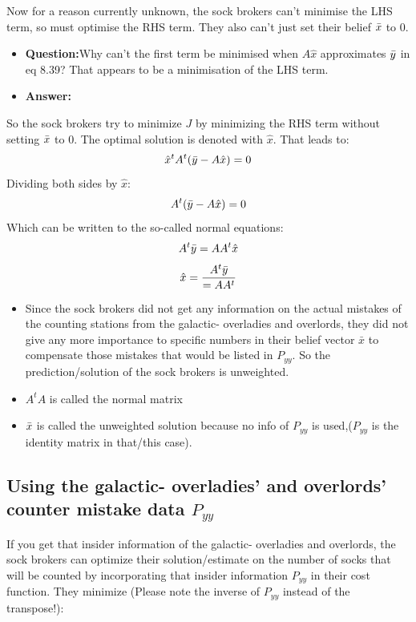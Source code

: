 Now for a reason currently unknown, the sock brokers can't minimise the LHS term, so must optimise the RHS term. They also can't just set their belief $\Bar{x}$ to 0.
\begin{itemize}
    \item \textbf{Question:}Why can't the first term be minimised when $A\hat{x}$ approximates $\Bar{y}$ in eq 8.39? That appears to be a minimisation of the LHS term.
    \item \textbf{Answer:}
\end{itemize}
So the sock brokers try to minimize $J$ by minimizing the RHS term without setting $\Bar{x}$ to 0. The optimal solution is denoted with $\hat{x}$. That leads to:
\begin{equation}
    \hat{x}^tA^t(\Bar{y}-A\hat{x})=0
\end{equation}
Dividing both sides by $\hat{x}$:
\begin{equation}
    A^t(\Bar{y}-A\hat{x})=0
\end{equation}
Which can be written to the so-called normal equations:
\begin{equation}
    A^t\Bar{y}=AA^t\hat{x}
\end{equation}
\begin{equation}
    \hat{x}=\frac{A^t\Bar{y}}{=AA^t}
    \label{eq:broker_solution}
\end{equation}
\begin{itemize}
    \item 
    Since the sock brokers did not get any information on the actual mistakes of the counting stations from the galactic- overladies and overlords, they did not give any more importance to specific numbers in their belief vector $\bar{x}$ to compensate those mistakes that would be listed in $P_{yy}$. So the prediction/solution of the sock brokers is unweighted.
    \item $A^tA$ is called the normal matrix 
    \item $\Bar{x}$ is called the unweighted solution because no info of $P_{yy}$ is used,($P_{yy}$ is the identity matrix in that/this case).
\end{itemize}
\subsection{Using the galactic- overladies' and overlords' counter mistake data $P_{yy}$}
If you get that insider information of the galactic- overladies and overlords, the sock brokers can optimize their solution/estimate on the number of socks that will be counted by incorporating that insider information $P_{yy}$ in their cost function. They minimize (Please note the inverse of $P_{yy}$ instead of the transpose!):

